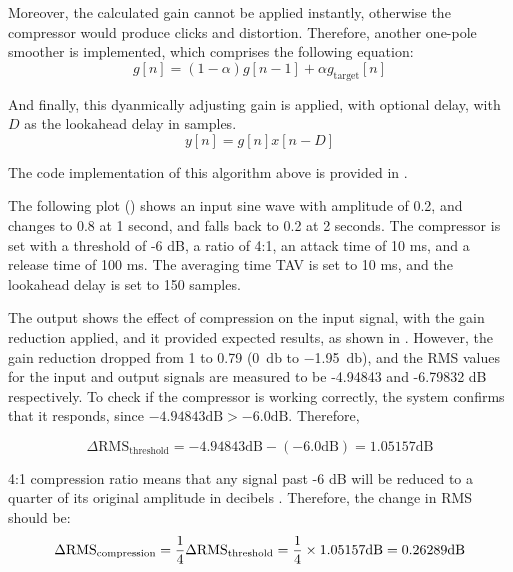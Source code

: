 Moreover, the calculated gain cannot be applied instantly, otherwise the compressor
would produce clicks and distortion. Therefore, another one-pole smoother is implemented,
which comprises the following equation:
\begin{equation}\label{eq:second_smoother}
    g[n] = (1 - \alpha)g[n-1] + \alpha g_{\text{target}}[n]
\end{equation}

And finally, this dyanmically adjusting gain is applied, with optional delay, with $D$ as the lookahead delay in samples.
\begin{equation}\label{eq:compression_transfer}
    y[n] = g[n] x[n - D] 
\end{equation}

The code implementation of this algorithm above is provided in .

The following plot () shows an input sine wave with amplitude of 0.2, and changes to 0.8 at 1 second, 
and falls back to 0.2 at 2 seconds. The compressor is set with a threshold of -6 dB, a ratio of 4:1,
an attack time of 10 ms, and a release time of 100 ms. The averaging time TAV 
\cite{dutilleux_nonlinear2011} is set to 10 ms, and the lookahead delay is set to 150 samples. 



The output shows the effect of compression on the input signal, with the gain reduction 
applied, and it provided expected results, as shown in . However,
the gain reduction dropped from 1 to 0.79 (\SI{0}{\decibel} to \SI{-1.95}{\decibel}), and the RMS
values for the input and output signals are measured to be -4.94843 and -6.79832 dB respectively.
To check if the compressor is working correctly, the system confirms that it responds, since
$-4.94843 \text{dB} > -6.0 \text{dB}$. Therefore,

$$
\Delta \text{RMS}_\text{threshold} = -4.94843 \text{dB} - (-6.0 \text{dB}) = 1.05157 \text{dB}
$$

4:1 compression ratio means that any signal past -6 dB will be reduced to a quarter of its original amplitude in 
decibels \cite{pluginboutique_compression_guide}. Therefore, the change in RMS should be:
$$
\Delta \text{RMS}_\text{compression} = \frac{1}{4} \Delta \text{RMS}_\text{threshold} = \frac{1}{4} \times 1.05157 \text{dB} \\
= 0.26289 \text{dB}
$$


